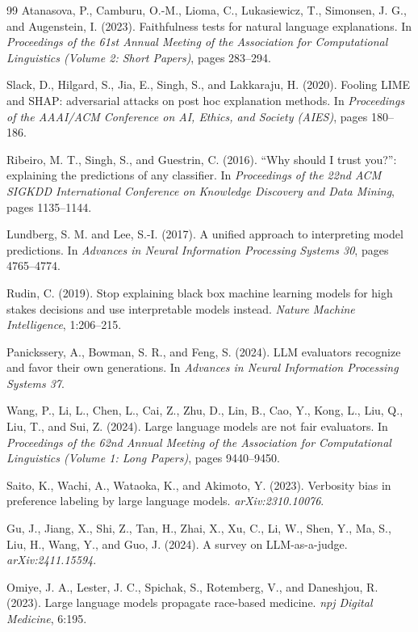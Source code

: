 \documentclass[11pt]{article}
\begin{document}
\begin{thebibliography}{99}
 Atanasova, P., Camburu, O.-M., Lioma, C., Lukasiewicz, T., Simonsen, J. G., and Augenstein, I. (2023). Faithfulness tests for natural language explanations. In \textit{Proceedings of the 61st Annual Meeting of the Association for Computational Linguistics (Volume 2: Short Papers)}, pages 283--294.

 Slack, D., Hilgard, S., Jia, E., Singh, S., and Lakkaraju, H. (2020). Fooling LIME and SHAP: adversarial attacks on post hoc explanation methods. In \textit{Proceedings of the AAAI/ACM Conference on AI, Ethics, and Society (AIES)}, pages 180--186.

 Ribeiro, M. T., Singh, S., and Guestrin, C. (2016). ``Why should I trust you?'': explaining the predictions of any classifier. In \textit{Proceedings of the 22nd ACM SIGKDD International Conference on Knowledge Discovery and Data Mining}, pages 1135--1144.

 Lundberg, S. M. and Lee, S.-I. (2017). A unified approach to interpreting model predictions. In \textit{Advances in Neural Information Processing Systems 30}, pages 4765--4774.

 Rudin, C. (2019). Stop explaining black box machine learning models for high stakes decisions and use interpretable models instead. \textit{Nature Machine Intelligence}, 1:206--215.

 Panickssery, A., Bowman, S. R., and Feng, S. (2024). LLM evaluators recognize and favor their own generations. In \textit{Advances in Neural Information Processing Systems 37}.

 Wang, P., Li, L., Chen, L., Cai, Z., Zhu, D., Lin, B., Cao, Y., Kong, L., Liu, Q., Liu, T., and Sui, Z. (2024). Large language models are not fair evaluators. In \textit{Proceedings of the 62nd Annual Meeting of the Association for Computational Linguistics (Volume 1: Long Papers)}, pages 9440--9450.

 Saito, K., Wachi, A., Wataoka, K., and Akimoto, Y. (2023). Verbosity bias in preference labeling by large language models. \textit{arXiv:2310.10076}.

 Gu, J., Jiang, X., Shi, Z., Tan, H., Zhai, X., Xu, C., Li, W., Shen, Y., Ma, S., Liu, H., Wang, Y., and Guo, J. (2024). A survey on LLM-as-a-judge. \textit{arXiv:2411.15594}.

 Omiye, J. A., Lester, J. C., Spichak, S., Rotemberg, V., and Daneshjou, R. (2023). Large language models propagate race-based medicine. \textit{npj Digital Medicine}, 6:195.


\end{thebibliography}
\end{document}
